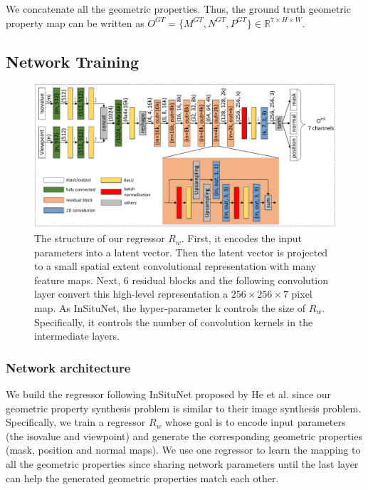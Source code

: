 \documentclass[journal]{vgtc}                %
\begin{document}
We concatenate all the geometric properties. Thus, the ground truth geometric property map can be written as $O^{GT} = \{M^{GT}, N^{GT}, P^{GT}\} \in \mathbb{R}^{7 \times H \times W}$. 

\subsection{Network Training}

\begin{figure}
  \centering
  \includegraphics[width=1\linewidth]{regressor}
  \caption{The structure of our regressor $R_w$. First, it encodes the input parameters into a latent vector. Then the latent vector is projected to a small spatial extent convolutional representation with many feature maps. Next, $6$ residual blocks and the following convolution layer convert this high-level representation a $256 \times 256 \times 7$ pixel map. As InSituNet, the hyper-parameter k controls the size of $R_w$. Specifically, it controls the number of convolution kernels in the intermediate layers.}
  \label{fig:regressor}
\end{figure}

\subsubsection{Network architecture}
We build the regressor following InSituNet proposed by He et al. \cite{he2019insitunet} since our geometric property synthesis problem is similar to their image synthesis problem. Specifically, we train a regressor $R_w$ whose goal is to encode input parameters (the isovalue and viewpoint) and generate the corresponding geometric properties (mask, position and normal maps). We use one regressor to learn the mapping to all the geometric properties since sharing network parameters until the last layer can help the generated geometric properties match each other.
\end{document}
